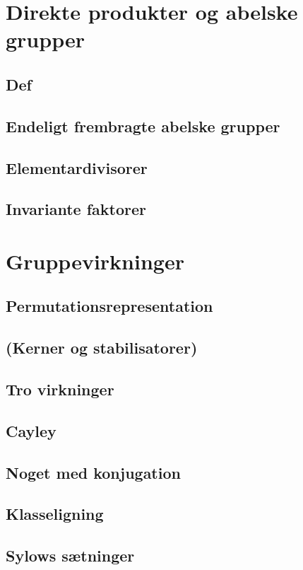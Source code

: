 \documentclass[11pt]{article}
\begin{document}
\section*{Direkte produkter og abelske grupper}
\subsection*{Def}
\subsection*{Endeligt frembragte abelske grupper}
\subsection*{Elementardivisorer}
\subsection*{Invariante faktorer}

\section*{Gruppevirkninger}
\subsection*{Permutationsrepresentation}
\subsection*{(Kerner og stabilisatorer)}
\subsection*{Tro virkninger}
\subsection*{Cayley}
\subsection*{Noget med konjugation}
\subsection*{Klasseligning}
\subsection*{Sylows sætninger}
\end{document}
